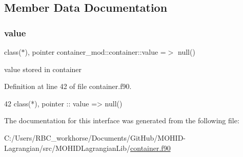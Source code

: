 \subsection{Member Data Documentation}
\mbox{\label{structcontainer__mod_1_1container_a297f4632156bf226aa8599a7f0cd55c0}} 
\subsubsection{\texorpdfstring{value}{value}}
{\footnotesize\ttfamily class($\ast$), pointer container\+\_\+mod\+::container\+::value =$>$ null()\hspace{0.3cm}{\ttfamily [private]}}



value stored in container 



Definition at line 42 of file container.\+f90.


\begin{DoxyCode}
42         \textcolor{keywordtype}{class}(*), \textcolor{keywordtype}{pointer} :: \textcolor{keywordtype}{value} => null() 
\end{DoxyCode}


The documentation for this interface was generated from the following file\+:\begin{DoxyCompactItemize}
\item 
C\+:/\+Users/\+R\+B\+C\+\_\+workhorse/\+Documents/\+Git\+Hub/\+M\+O\+H\+I\+D-\/\+Lagrangian/src/\+M\+O\+H\+I\+D\+Lagrangian\+Lib/\mbox{\hyperlink{container_8f90}{container.\+f90}}\end{DoxyCompactItemize}

